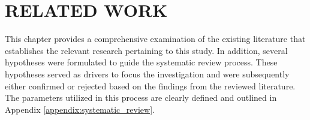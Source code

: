\chapter{RELATED WORK}
\label{chp:rel}


This chapter provides a comprehensive examination of the existing literature that establishes the relevant research pertaining to this study. In addition, several hypotheses were formulated to guide the systematic review process. These hypotheses served as drivers to focus the investigation and were subsequently either confirmed or rejected based on the findings from the reviewed literature. The parameters utilized in this process are clearly defined and outlined in Appendix  \ref{appendix:systematic_review}.

